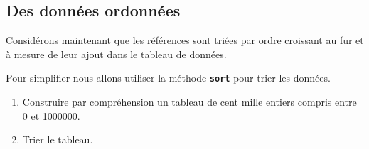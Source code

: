 \documentclass[a4paper,11pt]{article}
\begin{document}
\subsection{Des données ordonnées}
Considérons maintenant que les références sont triées par ordre croissant au fur et à mesure de leur ajout dans le tableau de données.
\begin{center}
\end{center}
\begin{activite}
Pour simplifier nous allons utiliser la méthode \textbf{\texttt{sort}} pour trier les données.
\begin{enumerate}
    \item Construire par compréhension un tableau de cent mille entiers compris entre 0 et 1000000.
    \item Trier le tableau.
\end{enumerate}
\end{activite}
\end{document}
